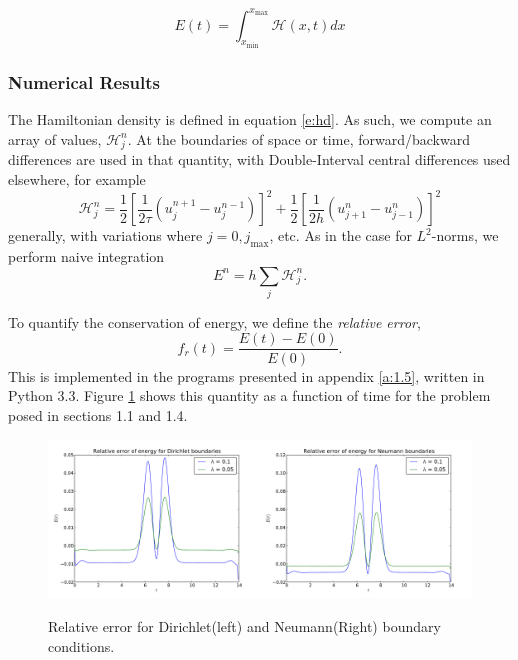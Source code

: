 \documentclass[10pt]{article}
\newcommand{\ujpn}{u_{j+1}^{n}}
\newcommand{\ujmn}{u_{j-1}^{n}}
\newcommand{\ujnp}{u_{j}^{n+1}}
\newcommand{\ujnm}{u_{j}^{n-1}}
\begin{document}
\begin{equation}
E(t) = \int_{x_\text{min}}^{x_\text{max}} \mathcal{H}(x,t) dx
\label{e:energy}
\end{equation}
\subsubsection*{Numerical Results}
The Hamiltonian density is defined in equation \ref{e:hd}. As such, we compute an
array of values, $\mathcal{H}_j^n$. At the boundaries of space or time,
forward/backward differences are used in that quantity, with Double-Interval
central differences used elsewhere, for example
$$ \mathcal{H}_j^n = \frac{1}{2}\left[\frac{1}{2\tau}\left(\ujnp - \ujnm\right)\right]^2
+ \frac{1}{2}\left[ \frac{1}{2h} \left(\ujpn - \ujmn\right)\right]^2 $$
generally, with variations where $j = 0 , j_\text{max}$, etc.
As in the case for $L^2$-norms, we perform naive integration
$$E^n = h\sum_j \mathcal{H}_j^n. $$

\noindent To quantify the conservation of energy, we define the {\it relative error},
\begin{equation}
f_r (t) = \frac{E(t) - E(0)}{E(0)}.
\label{e:relerr}
\end{equation}
This is implemented in the programs presented in appendix \ref{a:1.5}, written in Python 3.3.
Figure \ref{f:relerr} shows this quantity as a function of time for the problem
posed in sections 1.1 and 1.4.

\begin{figure}
  \centering
  \includegraphics[width=0.5\textwidth]{1/Ed.pdf}\includegraphics[width=0.5\textwidth]{1/En.pdf}
  \caption{Relative error for Dirichlet(left) and Neumann(Right) boundary conditions.}
  \label{f:relerr}
\end{figure}
\end{document}
